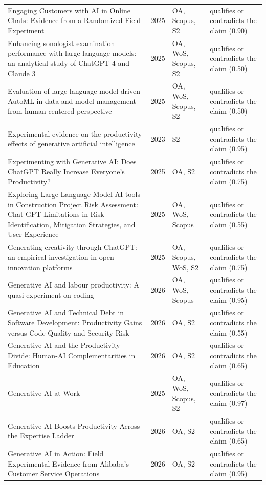 \begin{longtable}{@{}%
  >{\raggedright\arraybackslash}p{}c%
  >{\raggedright\arraybackslash}p{}%
  >{\raggedright\arraybackslash}p{}@{}}
Engaging Customers with AI in Online Chats: Evidence from a Randomized Field Experiment & 2025 & OA, Scopus, S2 & qualifies or contradicts the claim (0.90) \\
Enhancing sonologist examination performance with large language models: an analytical study of ChatGPT-4 and Claude 3 & 2025 & OA, WoS, Scopus, S2 & qualifies or contradicts the claim (0.50) \\
Evaluation of large language model-driven AutoML in data and model management from human-centered perspective & 2025 & OA, WoS, Scopus, S2 & qualifies or contradicts the claim (0.50) \\
Experimental evidence on the productivity effects of generative artificial intelligence & 2023 & S2 & qualifies or contradicts the claim (0.95) \\
Experimenting with Generative AI: Does ChatGPT Really Increase Everyone's Productivity? & 2025 & OA, S2 & qualifies or contradicts the claim (0.75) \\
Exploring Large Language Model AI tools in Construction Project Risk Assessment: Chat GPT Limitations in Risk Identification, Mitigation Strategies, and User Experience & 2025 & OA, WoS, Scopus & qualifies or contradicts the claim (0.55) \\
Generating creativity through ChatGPT: an empirical investigation in open innovation platforms & 2025 & OA, Scopus, WoS, S2 & qualifies or contradicts the claim (0.75) \\
Generative AI and labour productivity: A quasi experiment on coding & 2026 & OA, WoS, Scopus & qualifies or contradicts the claim (0.95) \\
Generative AI and Technical Debt in Software Development: Productivity Gains versus Code Quality and Security Risk & 2026 & OA, S2 & qualifies or contradicts the claim (0.55) \\
Generative AI and the Productivity Divide: Human-AI Complementarities in Education & 2026 & OA, S2 & qualifies or contradicts the claim (0.65) \\
Generative AI at Work & 2025 & OA, WoS, Scopus, S2 & qualifies or contradicts the claim (0.97) \\
Generative AI Boosts Productivity Across the Expertise Ladder & 2026 & OA, S2 & qualifies or contradicts the claim (0.65) \\
Generative AI in Action: Field Experimental Evidence from Alibaba's Customer Service Operations & 2026 & OA, S2 & qualifies or contradicts the claim (0.95) \\

\end{longtable}

